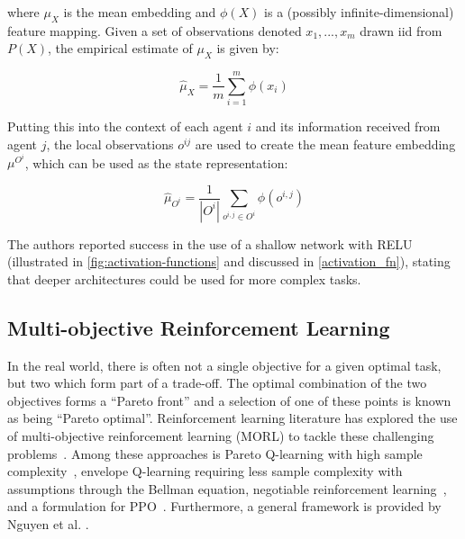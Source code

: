 where $\mu_X$ is the mean embedding and $\phi(X)$ is a (possibly infinite-dimensional) feature mapping. Given a set of observations denoted ${x_1,...,x_m}$ drawn \gls{iid} from $P(X)$, the empirical estimate of $\mu_X$ is given by:

\begin{equation}
\hat{\mu}_X=\frac{1}{m} \sum_{i=1}^m \phi\left(x_i\right)
\end{equation}

Putting this into the context of each agent $i$ and its information received from agent $j$, the local observations $o^{ij}$ are used to create the mean feature embedding $\mu^{O^i}$, which can be used as the state representation:

\begin{equation}
    \hat{\mu}_{O^i}=\frac{1}{\left|O^i\right|} \sum_{o^{i, j} \in O^i} \phi\left(o^{i, j}\right)
\end{equation}

The authors reported success in the use of a shallow network with \gls{RELU} (illustrated in \autoref{fig:activation-functions} and discussed in \autoref{activation_fn}), stating that deeper architectures could be used for more complex tasks. 

\subsection{Multi-objective Reinforcement Learning}\label{ssec:multi-objective}

In the real world, there is often not a single objective for a given optimal task, but two which form part of a trade-off. The optimal combination of the two objectives forms a ``Pareto front'' and a selection of one of these points is known as being ``Pareto optimal''. Reinforcement learning literature has explored the use of multi-objective reinforcement learning (MORL) to tackle these challenging problems~\cite{Roijers2015}. Among these approaches is Pareto Q-learning with high sample complexity~\cite{Moffaert2014}, envelope Q-learning \cite{Yang2019} requiring less sample complexity with assumptions through the Bellman equation, negotiable reinforcement learning~\cite{Desai2018}, and a formulation for \gls{PPO}~\cite{Khoi2021}. Furthermore, a general framework is provided by Nguyen et al. \cite{Nguyen2018}.


